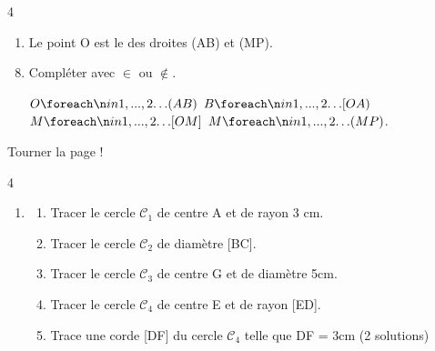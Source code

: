 \documentclass[a4paper]{book}
\begin{document}
{\begin{exerciceNote}{4}
\begin{minipage}{0.5\linewidth}
\begin{enumerate}
                \item Le point O est le \points[13] des droites (AB) et (MP).
            \end{enumerate}
        \end{minipage}
        \hfill
        \begin{minipage}{0.49\linewidth}
            \begin{center}
            \end{center}
        \end{minipage}

        \begin{enumerate}
            \setcounter{enumi}{7}
            \item Compléter avec $\in$ ou $\notin$.

            $O \points[2] (AB)$ \quad $B \points[2] [OA)$ \quad $M \points[2] [OM]$ \quad $M \points[2] (MP)$.
        \end{enumerate}
    \end{exerciceNote}

\vfill
\hfill Tourner la page !

\newpage


    \begin{exerciceNote}{4}
        \begin{enumerate}
            \item 
        
            \begin{enumerate}
                \item Tracer le cercle $\mathcal{C}_1$ de centre A et de rayon 3 cm.
    
                \item Tracer le cercle $\mathcal{C}_2$ de diamètre [BC].
    
                \item Tracer le cercle $\mathcal{C}_3$ de centre G et de diamètre 5cm.
    
                \item Tracer le cercle $\mathcal{C}_4$ de centre E et de rayon [ED].
    
                \item Trace une corde [DF] du cercle $\mathcal{C}_4$ telle que DF = 3cm (2 solutions)
            \end{enumerate}   
        \end{enumerate}


\end{exerciceNote}}
\end{document}
